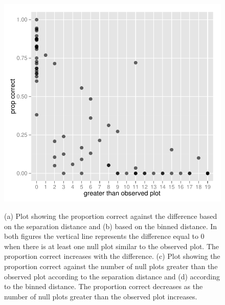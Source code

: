 \documentclass[12]{article}
\begin{document}
\begin{figure}[hbtp]
{\includegraphics[scale=0.55]{largep-grtr-bin-prop-10-5.pdf}
\label{lpcomp_1}
}
\label{lp-comp}
	\vspace{-.1in}
\caption[Optional caption for list of figures]{(a) Plot showing the proportion correct against the difference based on the separation distance and (b) based on the binned distance. In both figures the vertical line represents the difference equal to 0 when there is at least one null plot similar to the observed plot. The proportion correct increases with the difference. (c) Plot showing the proportion correct against the number of null plots greater than the observed plot according to the separation distance and (d) according to the binned distance. The proportion correct decreases as the number of null plots greater than the observed plot increases.}
\end{figure}
\end{document}
